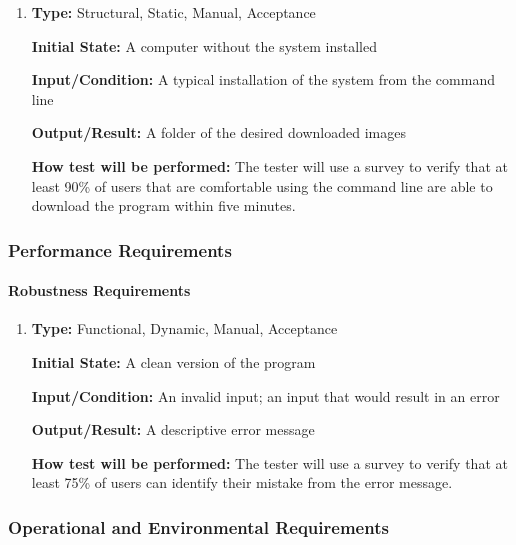 \documentclass[12pt, titlepage]{article}
\begin{document}
\begin{enumerate}[label=NFR-LR\textcolor{red}{2}:, wide=0pt, leftmargin=*]

\item \phantom{empty}

\textbf{Type:} Structural, Static, Manual, Acceptance
					
\textbf{Initial State:} A computer without the system installed
					
\textbf{Input/Condition:} A typical installation of the system from the command line
					
\textbf{Output/Result:} A folder of the desired downloaded images
					
\textbf{How test will be performed:} The tester will use a survey to verify that at least 90\% of users that are comfortable using the command line are able to download the program within five minutes.

\end{enumerate}

\subsubsection{Performance Requirements}
\label{PerfReqs}
		
\paragraph{Robustness Requirements}

\begin{enumerate}[label=NFR-RR\arabic*:, wide=0pt, leftmargin=*]

\item \phantom{empty}

\textbf{Type:} Functional, Dynamic, Manual, Acceptance
					
\textbf{Initial State:} A clean version of the program
					
\textbf{Input/Condition:} An invalid input; an input that would result in an error
					
\textbf{Output/Result:} A descriptive error message
					
\textbf{How test will be performed:} The tester will use a survey to verify that at least 75\% of users can identify their mistake from the error message.

\end{enumerate}

\subsubsection{Operational and Environmental Requirements}
		
\end{document}
